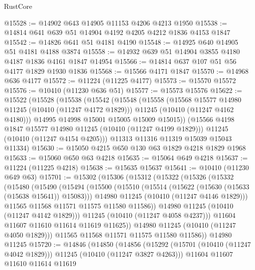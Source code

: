 \begin{lexlean}{RustCore}
\begin{coremodule}
@15528 := @14902 @643 @14905 @11153 @4206 @4213 @1950
@15538 := @14814 @641 @639 @51 @14904 @4192 @4205 @4212 @1836 @4153 @1847
@15542 := @14826 @641 @51 @4181 @4190
@15548 := @14925 @640 @14905 @51 @4181 @4188 @3874
@15558 := @14932 @639 @51 @14904 @3855 @4180 @4187 @1836 @4161 @1847 @14954
@15566 := @14814 @637 @107 @51 @56 @4177 @1829 @1930 @1836
@15568 := @15566 @4171 @1847
@15570 := @14968 @636 @4177
@15572 := @11224 (@11225 @4177)
@15573 := @15570 @15572
@15576 := @10410 (@11230 @636 @51)
@15577 := @15573 @15576
@15622 := @15522
    (@15528
      (@15538
        (@15542
          (@15548
            (@15558
              (@15568 @15577 @14980 @11245 (@10410 (@11247 @4172 @1829)))
              @11245
              (@10410 (@11247 @4162 @4180)))
            @14995
            @14998
            @15001
            @15005
            @15009
            @15015))
        (@15566 @4198 @1847 @15577 @14980 @11245 (@10410 (@11247 @4199 @1829)))
        @11245
        (@10410 (@11247 @4154 @4205)))
      @11313
      @11316
      @11319
      @15039
      @15043
      @11334)
@15630 := @15050 @4215 @650 @130 @63 @1829 @4218 @1829 @1968
@15633 := @15060 @650 @63 @4218
@15635 := @15064 @649 @4218
@15637 := @11224 (@11225 @4218)
@15638 := @15635 @15637
@15641 := @10410 (@11230 @649 @63)
@15701 := @15302
    (@15306
      (@15312
        (@15322
          (@15326
            (@15332
              (@15480
                (@15490
                  (@15494
                    (@15500
                      (@15510
                        (@15514 (@15622 (@15630 (@15633 (@15638 @15641)) @15083)))
                        @14980
                        @11245
                        (@10410 (@11247 @4146 @1829)))
                      @11565
                      @11568
                      @11571
                      @11575
                      @11580
                      @11586))
                  @14980
                  @11245
                  (@10410 (@11247 @4142 @1829)))
                @11245
                (@10410 (@11247 @4058 @4237)))
              @11604
              @11607
              @11610
              @11614
              @11619
              @11625))
          @14980
          @11245
          (@10410 (@11247 @4050 @1829)))
        @11565
        @11568
        @11571
        @11575
        @11580
        @11586))
    @14980
    @11245
@15720 := @14846
    (@14850
      (@14856
        (@15292 (@15701 (@10410 (@11247 @4042 @1829))) @11245 (@10410 (@11247 @3827 @4263)))
        @11604
        @11607
        @11610
        @11614
        @11619

\end{coremodule}
\end{lexlean}
